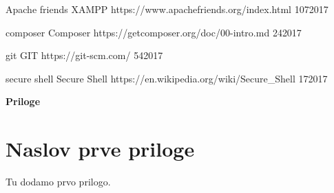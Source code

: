 \documentclass[12pt,a4paper,titlepage,openany]{report}
\begin{document}
\begin{thebibliography}{99}
\spletniVirZAvtorjem
    {Apache friends}
    {XAMPP}
    {https://www.apachefriends.org/index.html}
    {10}{7}{2017}

\spletniVirZAvtorjem
    {composer}
    {Composer}
    {https://getcomposer.org/doc/00-intro.md}
    {2}{4}{2017}

\spletniVirZAvtorjem
    {git}
    {GIT}
    {https://git-scm.com/}
    {5}{4}{2017}

\spletniVirZAvtorjem
    {secure shell}
    {Secure Shell}
    {https://en.wikipedia.org/wiki/Secure\_Shell}
    {1}{7}{2017}





\end{thebibliography}
\newpage

\pagestyle{fancyplain}
\vspace*{\fill}
     \begin{center}
          \bf{\Huge{Priloge}}
     \end{center}
\vspace*{\fill}
\thispagestyle{fancy}

\appendix
\thispagestyle{empty}

\chapter{Naslov prve priloge}
\thispagestyle{empty}
Tu dodamo prvo prilogo.



\end{document}
